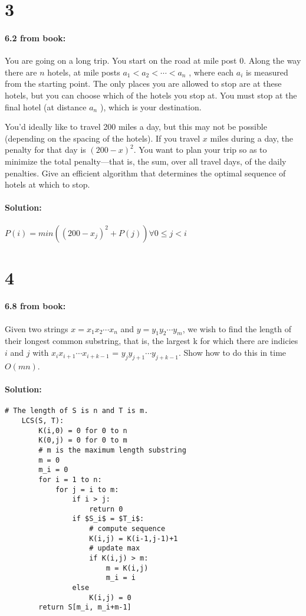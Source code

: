 \documentclass[12pt]{article}
\newcommand{\BigO}[1]{\ensuremath{O(#1)}}
\begin{document}
\section*{3}
\paragraph{6.2 from book:}
You are going on a long trip. You start on the road at mile post 0.
Along the way there are $n$ hotels, at mile posts $a_1 < a_2 < \cdots <
a_n$ , where each $a_i$ is measured from the starting point. The only
places you are allowed to stop are at these hotels, but you can choose
which of the hotels you stop at. You must stop at the final hotel (at
distance $a_n$ ), which is your destination.

You’d ideally like to travel 200 miles a day, but this may not be
possible (depending on the spacing of the hotels). If you travel $x$ miles
during a day, the penalty for that day is $(200 - x)^2$.  You want to
plan your trip so as to minimize the total penalty—that is,
the sum, over all travel days, of the daily penalties.  Give an
efficient algorithm that determines the optimal sequence of hotels at
which to stop.

\paragraph{Solution:}
$P(i) = min ( (200-x_j)^{2} + P(j) ) \forall 0 \le j < i$

\section*{4}
\paragraph{6.8 from book:}
Given two strings $x = x_1 x_2 \cdots x_n$ and $y = y_1 y_2 \cdots y_m$,
we wish to find the length of their longest common substring, that is,
the largest k for which there are indicies $i$ and $j$ with $x_i x_{i + 1}
\cdots x_{i + k - 1}$ = $y_j y_{j + 1} \cdots y_{j + k - 1}$. Show how
to do this in time $\BigO{mn}$.

\paragraph{Solution:}
\begin{lstlisting}[mathescape]
    # The length of S is n and T is m.
    LCS(S, T):
        K(i,0) = 0 for 0 to n
        K(0,j) = 0 for 0 to m
        # m is the maximum length substring
        m = 0
        m_i = 0
        for i = 1 to n:
            for j = i to m:
                if i > j:
                    return 0
                if $S_i$ = $T_i$:
                    # compute sequence
                    K(i,j) = K(i-1,j-1)+1
                    # update max
                    if K(i,j) > m:
                        m = K(i,j)
                        m_i = i
                else
                    K(i,j) = 0
        return S[m_i, m_i+m-1]
\end{lstlisting}
\end{document}
